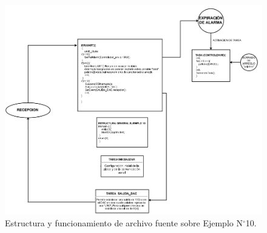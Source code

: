 \documentclass[12pt,letterpaper]{article}
\begin{document}
\begin{figure}[H]
\centering
\includegraphics[width=18 cm]{figuras/f53.png}
\caption{Estructura y funcionamiento de archivo fuente sobre Ejemplo N$^{\circ}$10.}
\label{estructej10}
\end{figure}
\end{document}
